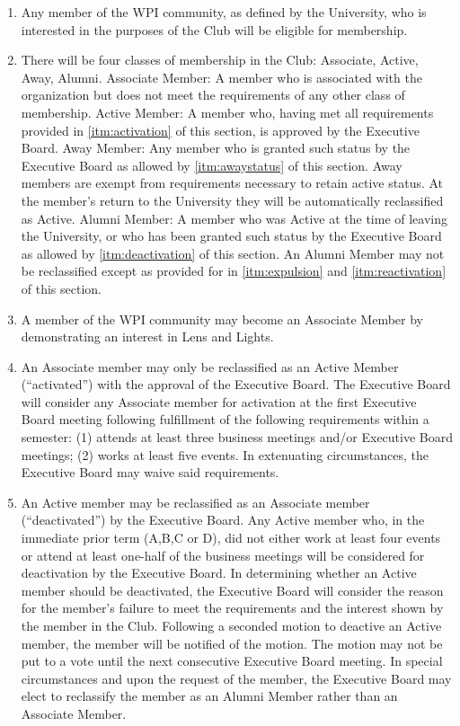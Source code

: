\documentclass[12pt,letterpaper,oneside]{book}
\begin{document}
\begin{enumerate}

\item \label{itm:wpicommunity} Any member of the WPI community, as defined by the University, who is interested in the purposes of the Club will be eligible for membership.
\item \label{itm:classesofmembership} There will be four classes of membership in the Club: Associate, Active, Away, Alumni.
\subitem Associate Member: A member who is associated with the organization but does not meet the requirements of any other class of membership.
\subitem Active Member: A member who, having met all requirements provided in \cref{itm:activation} of this section, is approved by the Executive Board.
\subitem Away Member: Any member who is granted such status by the Executive Board as allowed by \cref{itm:awaystatus} of this section. Away members are exempt from requirements necessary to retain active status. At the member’s return to the University they will be automatically reclassified as Active.
\subitem Alumni Member: A member who was Active at the time of leaving the University, or who has been granted such status by the Executive Board as allowed by \cref{itm:deactivation} of this section. An Alumni Member may not be reclassified except as provided for in \cref{itm:expulsion} and \cref{itm:reactivation} of this section.
\item \label{itm:association} A member of the WPI community may become an Associate Member by demonstrating an interest in Lens and Lights.
\item \label{itm:activation} An Associate member may only be reclassified as an Active Member (“activated”) with the approval of the Executive Board. The Executive Board will consider any Associate member for activation at the first Executive Board meeting following fulfillment of the following requirements within a semester: (1) attends at least three business meetings and/or Executive Board meetings; (2) works at least five events. In extenuating circumstances, the Executive Board may waive said requirements.
\item \label{itm:deactivation} An Active member may be reclassified as an Associate member (“deactivated”) by the Executive Board. Any Active member who, in the immediate prior term (A,B,C or D), did not either work at least four events or attend at least one-half of the business meetings will be considered for deactivation by the Executive Board. In determining whether an Active member should be deactivated, the Executive Board will consider the reason for the member’s failure to meet the requirements and the interest shown by the member in the Club. Following a seconded motion to deactive an Active member, the member will be notified of the motion. The motion may not be put to a vote until the next consecutive Executive Board meeting. In special circumstances and upon the request of the member, the Executive Board may elect to reclassify the member as an Alumni Member rather than an Associate Member.

\end{enumerate}
\end{document}
